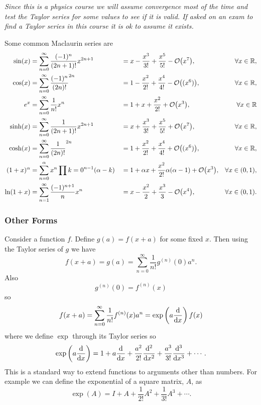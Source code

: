\documentclass[a4paper]{article}
\renewcommand{\ident}{I}
\begin{document}
    \textit{
    Since this is a physics course we will assume convergence most of the time and test the Taylor series for some values to see if it is valid.
    If asked on an exam to find a Taylor series in this course it is ok to assume it exists.
    }

    Some common Maclaurin series are
    \begin{align*}
        \sin(x) &= \sum_{n=0}^{\infty} \frac{(-1)^n}{(2n + 1)!}x^{2n+1} &&= x - \frac{x^3}{3!} + \frac{x^5}{5!} - \order{x^7}, &\forall x\in\reals,\\
        \cos(x) &= \sum_{n=0}^{\infty} \frac{(-1)^n}{(2n)!}^{2n} &&= 1 - \frac{x^2}{2!} + \frac{x^4}{4!} - \order{(x^6)}, &\forall x\in\reals,\\
        e^x &= \sum_{n=0}^{\infty} \frac{1}{n!}x^n &&= 1 + x + \frac{x^2}{2!} + \order{x^3}, &\forall x\in\reals\\
        \sinh(x) &= \sum_{n=0}^{\infty} \frac{1}{(2n + 1)!}x^{2n+1} &&= x + \frac{x^3}{3!} + \frac{x^5}{5!} + \order{x^7}, &\forall x\in\reals,\\
        \cosh(x) &= \sum_{n=0}^{\infty} \frac{1}{(2n)!}^{2n} &&= 1 + \frac{x^2}{2!} + \frac{x^4}{4!} + \order{(x^6)}, &\forall x\in\reals,\\
        (1 + x)^{\alpha} &= \sum_{n=0}^{\alpha} x^n\prod{k=0}^{n-1}(\alpha-k) &&= 1 + \alpha x + \frac{x^2}{2!}\alpha(\alpha-1) + \order{x^3}, &\forall x\in(0, 1),\\
        \ln(1 + x) &= \sum_{n=1}^{\infty}\frac{(-1)^{n+1}}{n}x^n &&= x - \frac{x^2}{2} + \frac{x^3}{3} - \order{x^4}, &\forall x\in(0, 1).
    \end{align*}

    \subsubsection{Other Forms}
    Consider a function \(f\).
    Define \(g(a) = f(x + a)\) for some fixed \(x\).
    Then using the Taylor series of \(g\) we have
    \[f(x + a) = g(a) = \sum_{n=0}^{\infty}\frac{1}{n!}g^{(n)}(0)a^n.\]
    Also
    \[g^{(n)}(0) = f^{(n)}(x)\]
    so
    \[f(x + a) = \sum_{n=0}^{\infty} \frac{1}{n!}f^{(n)}(x)a^n = \exp\left(a\dv{x}\right)f(x)\]
    where we define \(\exp\) through its Taylor series so
    \[\exp\left(a\dv{x}\right) = 1 + a\dv{x} + \frac{a^2}{2!}\dv[2]{x} + \frac{a^3}{3!}\dv[3]{x} + \dotsb.\]
    This is a standard way to extend functions to arguments other than numbers.
    For example we can define the exponential of a square matrix, \(A\), as
    \[\exp(A) = \ident + A + \frac{1}{2!}A^2 + \frac{1}{3!}A^3 + \dotsb.\]
    
\end{document}
